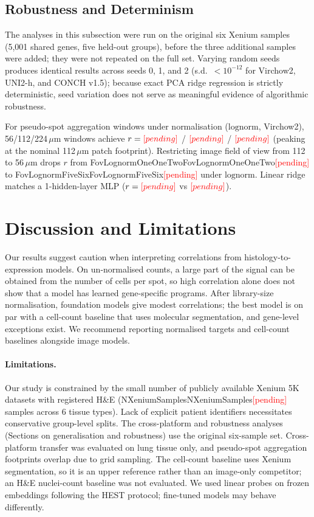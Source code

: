 \documentclass[10pt,twocolumn]{article}
\providecommand{\pending}{\textcolor{red}{[pending]}}
\newcommand{\num}[1]{\ifcsname #1\endcsname\csname #1\endcsname\else\pending\fi}
\begin{document}
\subsection{Robustness and Determinism}
The analyses in this subsection were run on the original six Xenium samples (5{,}001 shared genes, five held-out groups), before the three additional samples were added; they were not repeated on the full set. Varying random seeds produces identical results across seeds 0, 1, and 2 (s.d.\ $< 10^{-12}$ for Virchow2, UNI2-h, and CONCH v1.5); because exact PCA ridge regression is strictly deterministic, seed variation does not serve as meaningful evidence of algorithmic robustness. 

For pseudo-spot aggregation windows under normalisation ($\text{lognorm}$, Virchow2), 56/112/224\,$\mu$m windows achieve $r=\num{WindowLognormFiveSix}$ / $\num{WindowLognormOneOneTwo}$ / $\num{WindowLognormTwoTwoFour}$ (peaking at the nominal 112\,$\mu$m patch footprint). Restricting image field of view from 112 to 56\,$\mu$m drops $r$ from \num{FovLognormOneOneTwo} to \num{FovLognormFiveSix} under $\text{lognorm}$. Linear ridge matches a 1-hidden-layer MLP ($r=\num{HeadLogOnePlusRidge}$ vs $\num{HeadLogOnePlusMlp}$).

\section{Discussion and Limitations}
\label{sec:discussion}
Our results suggest caution when interpreting correlations from histology-to-expression models. On un-normalised counts, a large part of the signal can be obtained from the number of cells per spot, so high correlation alone does not show that a model has learned gene-specific programs. After library-size normalisation, foundation models give modest correlations; the best model is on par with a cell-count baseline that uses molecular segmentation, and gene-level exceptions exist. We recommend reporting normalised targets and cell-count baselines alongside image models.

\paragraph{Limitations.}
Our study is constrained by the small number of publicly available Xenium 5K datasets with registered H\&E (\num{NXeniumSamples} samples across 6 tissue types). Lack of explicit patient identifiers necessitates conservative group-level splits. The cross-platform and robustness analyses (Sections on generalisation and robustness) use the original six-sample set. Cross-platform transfer was evaluated on lung tissue only, and pseudo-spot aggregation footprints overlap due to grid sampling. The cell-count baseline uses Xenium segmentation, so it is an upper reference rather than an image-only competitor; an H\&E nuclei-count baseline was not evaluated. We used linear probes on frozen embeddings following the HEST protocol; fine-tuned models may behave differently.
\end{document}
